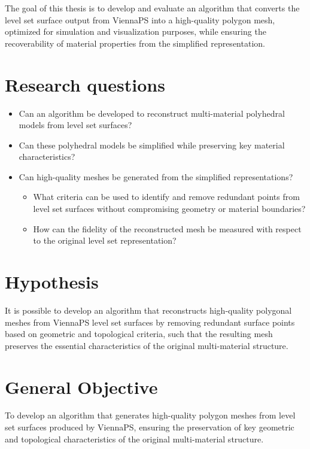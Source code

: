 \documentclass[submission]{eptcs}
\begin{document}
The goal of this thesis is to develop and evaluate an algorithm that converts the level set surface output from ViennaPS into a high-quality polygon mesh, optimized for simulation and visualization purposes, while ensuring the recoverability of material properties from the simplified representation.

\section{Research questions}

\begin{itemize}
    \item Can an algorithm be developed to reconstruct multi-material polyhedral models from level set surfaces?
    \item Can these polyhedral models be simplified while preserving key material characteristics?
    \item Can high-quality meshes be generated from the simplified representations?
        \begin{itemize}
    \item What criteria can be used to identify and remove redundant points from level set surfaces without compromising geometry or material boundaries?
    \item How can the fidelity of the reconstructed mesh be measured with respect to the original level set representation?
\end{itemize}
\end{itemize}


\section{Hypothesis}

It is possible to develop an algorithm that reconstructs high-quality polygonal meshes from ViennaPS level set surfaces by removing redundant surface points based on geometric and topological criteria, such that the resulting mesh preserves the essential characteristics of the original multi-material structure.

\section{General Objective}

To develop an algorithm that generates high-quality polygon meshes from level set surfaces produced by ViennaPS, ensuring the preservation of key geometric and topological characteristics of the original multi-material structure.
\end{document}
